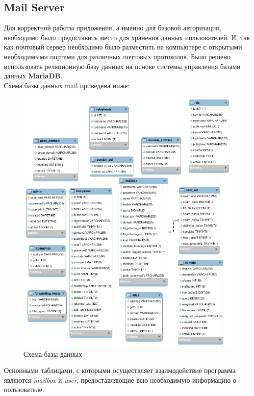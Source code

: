 \documentclass{article}
\begin{document}
\subsection{Mail Server}
Для корректной работы приложения, а именно для базовой авторизации, необходимо было предоставить место для хранения данных пользователей. И, так как почтовый сервер необходимо было разместить на компьютере с открытыми необходимыми портами для различных почтовых протоколов. Было решено использовать реляционную базу данных на основе системы управления базами данных \textbf{MariaDB}. \\

Схема базы данных mail приведена ниже:
\begin{figure}[H]
        \begin{flushleft}        \centerline{\includegraphics[scale=0.4]{scheme2.png}}
        \caption{Схема базы данных}
        \end{flushleft}
\end{figure}

Основными таблицами, с которыми осуществляет взаимодействие программа являются \emph{mailbox} и \emph{user}, предоставляющие всю необходимую информацию о пользователе. \\
\end{document}
